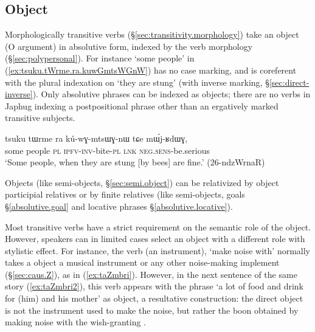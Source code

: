 \subsection{Object} \label{sec:absolutive.P}
     
Morphologically transitive verbs (§\ref{sec:transitivity.morphology}) take an object (O argument) in absolutive form, indexed by the verb morphology (§\ref{sec:polypersonal}). For instance  `some people' in (\ref{ex:tsuku.tWrme.ra.kuwGmtsWGnW}) has no case marking, and is coreferent with the plural indexation on  `they are stung' (with inverse marking, §\ref{sec:direct-inverse}). Only absolutive phrases can be indexed as objects; there are no verbs in Japhug indexing a postpositional phrase other than an ergatively marked transitive subjects.

\begin{exe}
\ex \label{ex:tsuku.tWrme.ra.kuwGmtsWGnW}
\gll tsuku tɯrme ra kú-wɣ-mtsɯɣ-nɯ tɕe mɯ́j-ʁdɯɣ, \\
some people \textsc{pl} \textsc{ipfv}-\textsc{inv}-bite-\textsc{pl} \textsc{lnk} \textsc{neg}.\textsc{sens}-be.serious \\
\glt `Some people, when they are stung [by bees] are fine.' (26-ndzWrnaR)
\end{exe}

Objects (like semi-objects, §\ref{sec:semi.object}) can be relativized by object participial relatives or by finite relatives (like semi-objects, goals §\ref{absolutive.goal}  and locative phrases §\ref{absolutive.locative}).

Most transitive verbs have  a strict requirement on the semantic role of the object. However, speakers can in limited cases select an object with a different role with stylistic effect. For instance, the verb  (an instrument), `make noise with' normally takes a object a musical instrument or any other noise-making implement  (§\ref{sec:caus.Z}), as in (\ref{ex:taZmbri}). However, in the next sentence of the same story (\ref{ex:taZmbri2}), this verb appears with the phrase  `a lot of food and drink for (him) and his mother' as object, a resultative construction: the direct object is not the instrument used to make the noise, but rather the boon obtained by making noise with the wish-granting .

